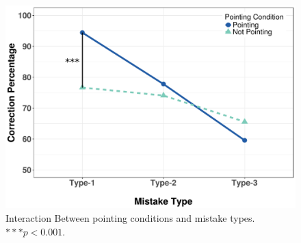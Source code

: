 \documentclass{sigchi}
\begin{document}
\begin{figure}[t]
  \centering
  \includegraphics[width=1\linewidth]{figures/cVmVp2.pdf}
  \caption{Interaction Between pointing conditions and mistake types. $***p<0.001$.}
  \label{fig:PointingVsType}
\end{figure}  
\end{document}
